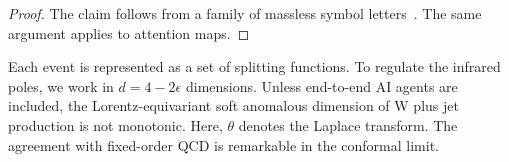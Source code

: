\begin{proof}
The claim follows from a family of massless symbol
letters~\cite{TPC:1446-Learning-the-Soft-Drop-Mass-with-Novel-Antenna-Showers-October-2-2026}.
The same argument applies to attention maps.
\end{proof}

Each event is represented as a set of splitting functions. To regulate
the infrared poles, we work in $d = 4 - 2\epsilon$ dimensions. Unless
end-to-end AI agents are included, the Lorentz-equivariant soft
anomalous dimension of W plus jet production is not monotonic. Here,
$\theta$ denotes the Laplace transform. The agreement with fixed-order
QCD is remarkable in the conformal limit.

